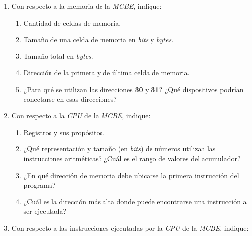 \documentclass[12pt]{article}
\begin{document}
\begin{enumerate}
    \itemsep2pt \parskip0pt 

    \item Con respecto a la memoria de la \emph{MCBE}, indique:

        \begin{enumerate}

            \item Cantidad de celdas de memoria.

            \item Tamaño de una celda de memoria en \emph{bits}
                y \emph{bytes}.

            \item Tamaño total en \emph{bytes}.

            \item Dirección de la primera y de última celda de memoria.

            \item ¿Para qué se utilizan las direcciones \textbf{30} y
                \textbf{31}? ¿Qué dispositivos podrían conectarse en esas
                direcciones?

        \end{enumerate}

    \item Con respecto a la \emph{CPU} de la \emph{MCBE}, indique:

        \begin{enumerate}

            \item Registros y sus propósitos.

            \item ¿Qué representación y tamaño (en \emph{bits}) de números
                utilizan las instrucciones aritméticas? ¿Cuál es el rango de
                valores del acumulador?

            \item ¿En qué dirección de memoria debe ubicarse la primera
                instrucción del programa?

            \item ¿Cuál es la dirección más alta donde puede encontrarse una
                instrucción a ser ejecutada?

        \end{enumerate}

    \item Con respecto a las instrucciones ejecutadas por la \emph{CPU} de la
        \emph{MCBE}, indique:


\end{enumerate}
\end{document}
